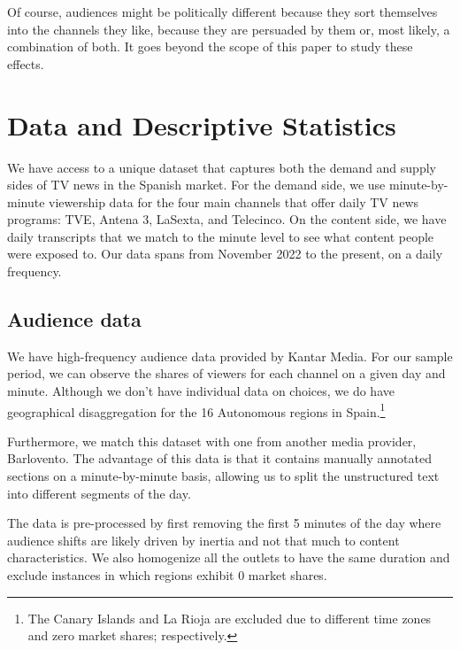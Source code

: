 \documentclass[12pt]{article}
\begin{document}
Of course, audiences might be politically different because they sort themselves into the channels they like, because they are persuaded by them or, most likely, a combination of both. It goes beyond the scope of this paper to study these effects. 





\section{Data and Descriptive Statistics}

\label{section:data}

We have access to a unique dataset that captures both the demand and supply sides of TV news in the Spanish market. For the demand side, we use minute-by-minute viewership data for the four main channels that offer daily TV news programs: TVE, Antena 3, LaSexta, and Telecinco. On the content side, we have daily transcripts that we match to the minute level to see what content people were exposed to. Our data spans from November 2022 to the present, on a daily frequency.



\subsection*{Audience data }


We have high-frequency audience data provided by Kantar Media. For our sample period, we can observe the shares of viewers for each channel on a given day and minute. Although we don't have individual data on choices, we do have geographical disaggregation for the 16 Autonomous regions in Spain.\footnote{The Canary Islands and La Rioja are excluded due to different time zones and zero market shares; respectively.}

Furthermore, we match this dataset with one from another media provider, Barlovento. The advantage of this data is that it contains manually annotated sections on a minute-by-minute basis, allowing us to split the unstructured text into different segments of the day. 

The data is pre-processed by first removing the first 5 minutes of the day where audience shifts are likely driven by inertia and not that much to content characteristics. We also homogenize all the outlets to have the same duration and exclude instances in which regions exhibit 0 market shares. 
\end{document}
